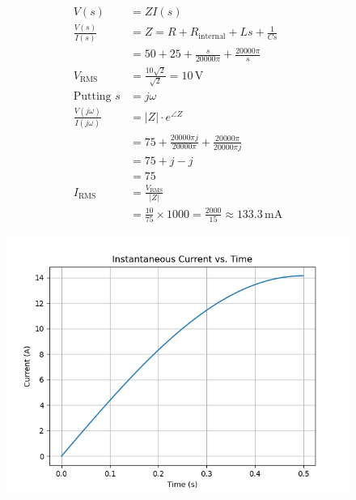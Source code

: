 \documentclass[journal,12pt,onecolumn]{IEEEtran}
\begin{document}
\begin{align}
    V(s) &= Z I(s) \\
    \frac{V(s)}{I(s)} &= Z = R + R_{\text{internal}} + Ls + \frac{1}{Cs} \\
    &= 50 + 25 + \frac{s}{20000\pi} + \frac{20000\pi}{s} \\
    V_{\text{RMS}} &= \frac{10\sqrt{2}}{\sqrt{2}} = 10 \, \text{V} \\
    \text{Putting } s &= j\omega \\
    \frac{V(j\omega)}{I(j\omega)} &= |Z| \cdot e^{\angle Z} \\
    &= 75 + \frac{20000 \pi j}{20000 \pi} + \frac{20000\pi }{20000 \pi j} \\
    &= 75 + j - j \\
    &=75 \\
    I_{\text{RMS}} &= \frac{V_{\text{RMS}}}{|Z|}  \\
    &= \frac{10}{75} \times 1000 = \frac{2000}{15} \approx 133.3 \, \text{mA}
\end{align}
\begin{figure}[h!]
    \centering
    \includegraphics[width=\columnwidth]{figs/gate.png}    
\end{figure}
\end{document}
